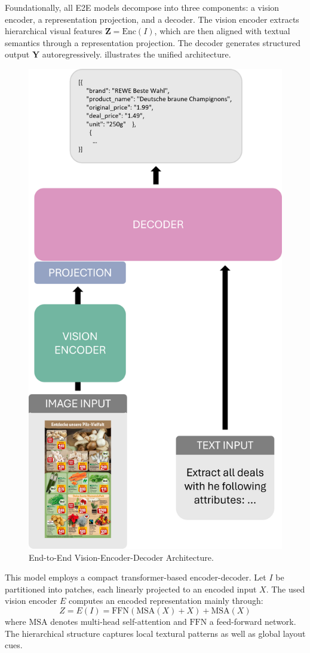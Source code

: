 \documentclass[11pt]{article}
\begin{document}
Foundationally, all E2E models decompose into three components: a vision encoder, a representation projection, and a decoder. The vision encoder extracts hierarchical visual features $ \mathbf{Z} = \text{Enc}(I) $, which are then aligned with textual semantics through a representation projection. The decoder generates structured output $ \mathbf{Y} $ autoregressively.  illustrates the unified architecture.

\begin{figure}[h!]
    \centering
    \includegraphics[width=0.5\linewidth]{figures/vlm_arch.png}
    \caption{End-to-End Vision-Encoder-Decoder Architecture.}
    \label{fig:e2e_arch}
\end{figure}

 This model employs a compact transformer-based encoder-decoder. Let $ I $ be partitioned into patches, each linearly projected to an encoded input $X$. The used vision encoder $E$ computes an encoded representation mainly through:
\begin{equation}
Z = E(I) = \text{FFN}(\text{MSA}(X) + X) + \text{MSA}(X)
\end{equation}  
where $\text{MSA}$ denotes multi-head self-attention and $\text{FFN}$ a feed-forward network. The hierarchical structure captures local textural patterns as well as global layout cues.  
\end{document}
